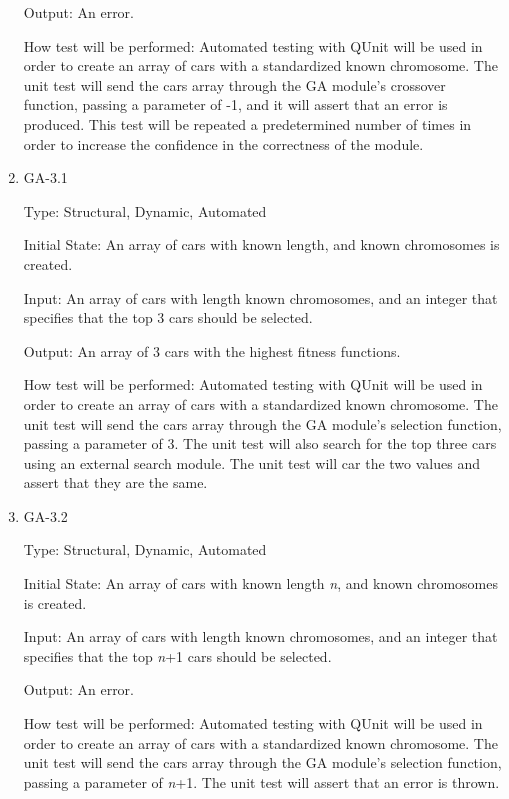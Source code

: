\documentclass[12pt, titlepage]{article}
\begin{document}
\begin{enumerate}
Output: An error.
					
How test will be performed: Automated testing with QUnit will be used in order 
to create an array of cars with a standardized known chromosome. The unit test 
will send the cars array through the GA module's crossover function, passing a 
parameter of -1, and it will assert that an error is produced. This test will be 
repeated  a predetermined number of times in order to increase the confidence in 
the correctness of the module.

\item{GA-3.1\\}

Type: Structural, Dynamic, Automated
					
Initial State: An array of cars with known length, and known chromosomes is 
created.
					
Input: An array of cars with length known chromosomes, and an integer that 
specifies that the top 3 cars should be selected.
					
Output: An array of 3 cars with the highest fitness functions.
					
How test will be performed: Automated testing with QUnit will be used in order 
to create an array of cars with a standardized known chromosome. The unit test 
will send the cars array through the GA module's selection function, passing a 
parameter of 3. The unit test will also search for the top three cars using an 
external search module. The unit test will car the two values and assert that 
they are the same.


\item{GA-3.2\\}

Type: Structural, Dynamic, Automated
					
Initial State: An array of cars with known length \textit{n}, and known 
chromosomes is created.
					
Input: An array of cars with length known chromosomes, and an integer that 
specifies that the top  \textit{n}+1 cars should be selected.
					
Output: An error.
					
How test will be performed: Automated testing with QUnit will be used in order 
to create an array of cars with a standardized known chromosome. The unit test 
will send the cars array through the GA module's selection function, passing a 
parameter of \textit{n}+1. The unit test will assert that an error is thrown.



\end{enumerate}
\end{document}
